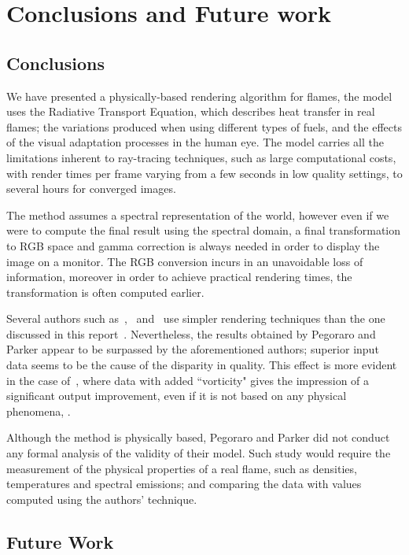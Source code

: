 \chapter{Conclusions and Future work}
\label{ch:conclusions}

\section{Conclusions}

We have presented a physically-based rendering algorithm for flames, the model uses the Radiative Transport Equation, which describes heat transfer in real flames; the variations produced when using different types of fuels, and the effects of the visual adaptation processes in the human eye.
The model carries all the limitations inherent to ray-tracing techniques, such as large computational costs, with render times per frame varying from a few seconds in low quality settings, to several hours for converged images.

The method assumes a spectral representation of the world, however even if we were to compute the final result using the spectral domain, a final transformation to RGB space and gamma correction is always needed in order to display the image on a monitor.
The RGB conversion incurs in an unavoidable loss of information, moreover in order to achieve practical rendering times, the transformation is often computed earlier.

Several authors such as~\cite{Hong:2007},~\cite{Horvath:2009} and~\cite{Jamriska:2015} use simpler rendering techniques than the one discussed in this report~\cite{Pegoraro:2006}.
Nevertheless, the results obtained by Pegoraro and Parker appear to be surpassed by the aforementioned authors; superior input data seems to be the cause of the disparity in quality.
This effect is more evident in the case of~\cite{Hong:2007}, where data with added ``vorticity" gives the impression of a significant output improvement, even if it is not based on any physical phenomena, .

Although the method is physically based, Pegoraro and Parker did not conduct any formal analysis of the validity of their model.
Such study would require the measurement of the physical properties of a real flame, such as densities, temperatures and spectral emissions; and comparing the data with values computed using the authors' technique.

\section{Future Work}

